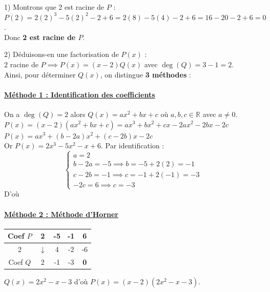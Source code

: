 \documentclass[12pt,a4paper]{article}
\begin{document}
1) Montrons que 2 est racine de $P$ : \\
$P(2) = 2(2)^3 - 5(2)^2 - 2 + 6 = 2(8) - 5(4) - 2 + 6 = 16 - 20 - 2 + 6 = 0$. \\
Donc \textbf{2 est racine de $P$}.

2) Déduisons-en une factorisation de $P(x)$ : \\
2 racine de $P \implies P(x) = (x - 2) Q(x)$ avec $\deg(Q) = 3 - 1 = 2$. \\
Ainsi, pour déterminer $Q(x)$, on distingue \textbf{3 méthodes} :

\paragraph{\underline{Méthode 1 : Identification des coefficients}}
On a $\deg(Q) = 2$ alors $Q(x) = ax^2 + bx + c$ où $a, b, c \in \mathbb{R}$ avec $a \neq 0$. \\
$P(x) = (x - 2)(ax^2 + bx + c) = ax^3 + bx^2 + cx - 2ax^2 - 2bx - 2c$ \\
$P(x) = ax^3 + (b - 2a)x^2 + (c - 2b)x - 2c$ \\
Or $P(x) = 2x^3 - 5x^2 - x + 6$. Par identification :
\[
\begin{cases}
a = 2 \\
b - 2a = -5 \implies b = -5 + 2(2) = -1 \\
c - 2b = -1 \implies c = -1 + 2(-1) = -3 \\
-2c = 6 \implies c = -3
\end{cases}
\]
 \quad D'où 

\paragraph{\underline{Méthode 2 : Méthode d'Horner}}
\begin{center}
\begin{tabular}{|c|c|c|c|c|}
\hline
Coef $P$ & 2 & -5 & -1 & 6 \\ \hline
2 & $\downarrow$ & 4 & -2 & -6 \\ \hline
Coef $Q$ & 2 & -1 & -3 & \textbf{0} \\ \hline
\end{tabular}
\end{center}
$Q(x) = 2x^2 - x - 3$ d'où $P(x) = (x - 2)(2x^2 - x - 3)$.
\end{document}
